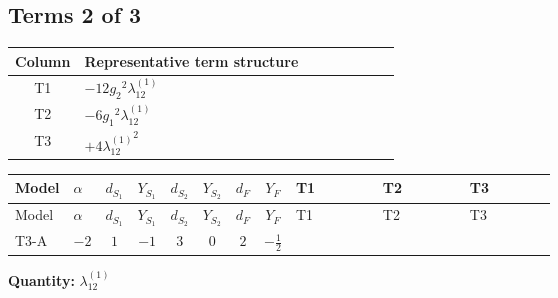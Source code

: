 \documentclass[8pt]{article}
\begin{document}
\begin{landscape}
\subsection*{Terms 2 of 3}
\begin{center}
\begin{tabular}{@{}c >{\raggedright\arraybackslash}p{0.82\linewidth}@{}}
\toprule
Column & Representative term structure \\
\midrule
T1 & \(\displaystyle -12 {g_2}^2 {\lambda_{12}^{(1)}}\) \\
\midrule
T2 & \(\displaystyle -6 {g_1}^2 {\lambda_{12}^{(1)}}\) \\
\midrule
T3 & \(\displaystyle +4 {\lambda_{12}^{(1)}}^2\) \\
\midrule
\bottomrule
\end{tabular}
\end{center}
\smallskip
\tiny
\begin{longtable}{@{}llcccccc >{\raggedright\arraybackslash}p{0.21\linewidth} >{\raggedright\arraybackslash}p{0.21\linewidth} >{\raggedright\arraybackslash}p{0.21\linewidth}@{}}
\toprule
Model & $\alpha$ & $d_{S_1}$ & $Y_{S_1}$ & $d_{S_2}$ & $Y_{S_2}$ & $d_F$ & $Y_F$ & T1 & T2 & T3 \\
\midrule
\endfirsthead
\toprule
Model & $\alpha$ & $d_{S_1}$ & $Y_{S_1}$ & $d_{S_2}$ & $Y_{S_2}$ & $d_F$ & $Y_F$ & T1 & T2 & T3 \\
\midrule
\endhead
T3-A & $-2$ & $1$ & $-1$ & $3$ & $0$ & $2$ & $-\frac{1}{2}$ & \scriptsize\adjustbox{max width=\linewidth}{$\begin{gathered} -12 {g_2}^2 {\lambda_{12}^{(1)}}\end{gathered}$} & \scriptsize\adjustbox{max width=\linewidth}{$\begin{gathered} -6 {g_1}^2 {\lambda_{12}^{(1)}}\end{gathered}$} & \scriptsize\adjustbox{max width=\linewidth}{$\begin{gathered} +4 {\lambda_{12}^{(1)}}^2\end{gathered}$} \\
\midrule
\bottomrule
\end{longtable}
\clearpage
\noindent\textbf{Quantity: }$\lambda_{12}^{(1)}$\par\smallskip

\end{landscape}
\end{document}
